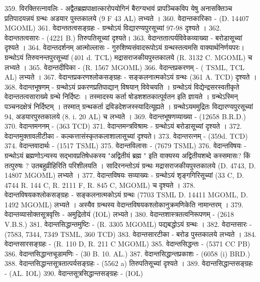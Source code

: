 359. विरक्तिरत्नावलिः - अद्वैतब्रह्मपाक्षात्कारोपयोगिनं बैराग्यभावं प्रापञ्चिकविप येषु अनासक्तिञ्च प्रतिपादयन्नयं ग्रन्थः अडयार पुस्तकालये (9 F 43 AL) लभ्यते । 
360. वेदान्तकारिकाः - (D. 14407 MGOML)
361. वेदान्ततत्वसङ्ग्रहः - ग्रन्थोऽयं विद्यारण्यपुरसूच्यां 97-98 दृश्यते । 
362. वेदान्ततत्वसारः - (4221 B.) तिरुपतिसूच्यां दृश्यते। 
363. वेदान्ततात्पर्यविवेकव्याख्या - बरोडासूच्यां दृश्यते । 
364. वेदान्तदर्शनम् आत्मोल्लासः - गुरुशिष्यसंवादरूपोऽयं ग्रन्थस्तत्वमसि वाक्यार्थनिर्णयपरः। ग्रन्थोऽयं तिरुवनन्तपुरसूच्यां (401 d. TCL) मद्रासराजकीयपुस्तकालये (R. 3132 C. MGOML) च लभ्यते । 
365. वेदान्तदीपिका - (R. 1567 MGOML)
366. वेदान्तप्रकरणम् - ( TSML, TCL AL) लभ्यते ।  
367. वेदान्तप्रकरणश्लोकसङ्ग्रहः - सङ्कलनात्मकोऽयं ग्रन्थः (361 A. TCD) दृश्यते । 
368. वेदान्तभूषणम् - ग्रन्थोऽयं प्रकरणप्रतिपाद्यान् विषयान् विवेचयति । ग्रन्थोऽयं विद्येन्द्रसरस्वतीकृते वेदान्ततत्वसाराख्ये ग्रन्थे निर्दिष्टः । तस्मादस्य कर्ता षोडशशतकात्पूर्वतन इति ज्ञायते । ग्रन्थेऽस्मिन् पञ्चनदक्षेत्रं निर्दिष्टम् । तस्मात् ग्रन्थकर्ता द्रविडदेशजस्स्यादित्यूह्यते । ग्रन्थोऽयममुद्रितः विद्यारण्यपुरसूच्यां 94, अडयारपुस्तकालये (8. i. 20 AL) च लभ्यते । 
369. वेदान्तभूषणव्याख्या - (12658 B.R.D.)
370. वेदान्तमननम् - (363 TCD)
371. वेदान्तमन्त्रविश्रामः - ग्रन्थोऽयं बरोडासूच्यां दृश्यते । 
372. वेदान्तमुक्तावलीटीका - कल्कत्तासंस्कृतकलाशालासूच्यां दृश्यते। 
373. वेदान्तरत्नम् - (359d. TCD)
374. वेदान्तवादार्थः - (1517 TSML)
375. वेदान्तविलासः - (7679 TSML)
376. वेदान्तविषयः - ग्रन्थोऽयं ब्रह्मणोऽन्यस्य सद्भावप्रतिषेधकस्य "अद्वितीयं ब्रह्म " इति वाक्यस्य अद्वितीयशब्दे कस्समासः? किं तत्पुरुषः ? उतबहुव्रीहिरिति परिशीलयति । सादिरनन्तोऽयं ग्रन्थः मद्रासराजकीयपुस्तकालये (D. 4743, D. 14807 MGOML) लभ्यते । 
377. वेदान्तविषयः सव्याख्यः - ग्रन्थोऽयं शृङ्गगिरिसूच्यां (33 C, D. 4744 R. 144 C, R. 2111 F, R. 845 C, MGOML) च दृश्यते । 
378. वेदान्तविषयकश्लोकसङ्ग्रहः - सङ्कलनात्मकोऽयं ग्रन्थः (7703 TSML D. 14411 MGOML, D. 1492 MGOML) लभ्यते । अस्यैव ग्रन्थस्य वेदान्तविषयकश्लोकानुक्रमणिकेति नामान्तरम् । 
379. वेदान्तव्यासोक्तसूत्रवृत्तिः - अमुद्रितोयं (IOL) लभ्यते। 
380. वेदान्तशास्त्रतत्वनिरूपणम् - (2618 V.B.S.)
381. वेदान्तसिद्धान्तमुष्टिः - (R. 3305 MGOML) पद्यबद्धोऽयं ग्रन्थः । 
382. वेदान्तसारः - (7583, 7344, 7349 TSML, 360  TCD)
383. वेदान्तसारटीका - बरोड पुस्तकालये लभ्यते । 
384. वेदान्तसारसङ्ग्रहः - (R. 110 D, R. 211 C MGOML)
385. वेदान्तसिद्धन्तः - (5371 CC PB)
386. वेदान्तसिद्धान्तचूडामणिः - (30 B. 10. AL.) 
387. वेदान्तसिद्धान्तप्रकाशः - (6058 (i) BRD.)
388. वेदान्तसिद्धान्तसूत्रतात्पर्यसङ्ग्रहः - (5562 a) तिरुपतिसूच्यां दृश्यते । 
389. वेदान्तसिद्धान्तसङ्ग्रहः - (AL. IOL)
390. वेदान्तसूत्रसिद्धान्तसङ्ग्रहः - (IOL)
